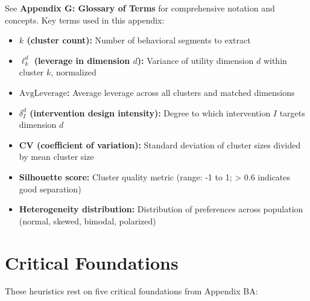 See \textbf{Appendix G: Glossary of Terms} for comprehensive notation and concepts. Key terms used in this appendix:

\begin{itemize}[nosep]
\item \textbf{$k$ (cluster count):} Number of behavioral segments to extract
\item \textbf{$\ell_k^d$ (leverage in dimension $d$):} Variance of utility dimension $d$ within cluster $k$, normalized
\item \textbf{$\text{AvgLeverage}$:} Average leverage across all clusters and matched dimensions
\item \textbf{$\delta_I^d$ (intervention design intensity):} Degree to which intervention $I$ targets dimension $d$
\item \textbf{CV (coefficient of variation):} Standard deviation of cluster sizes divided by mean cluster size
\item \textbf{Silhouette score:} Cluster quality metric (range: -1 to 1; > 0.6 indicates good separation)
\item \textbf{Heterogeneity distribution:} Distribution of preferences across population (normal, skewed, bimodal, polarized)
\end{itemize}


\section{Critical Foundations}
\label{sec:h-foundations}

These heuristics rest on five critical foundations from Appendix BA:

